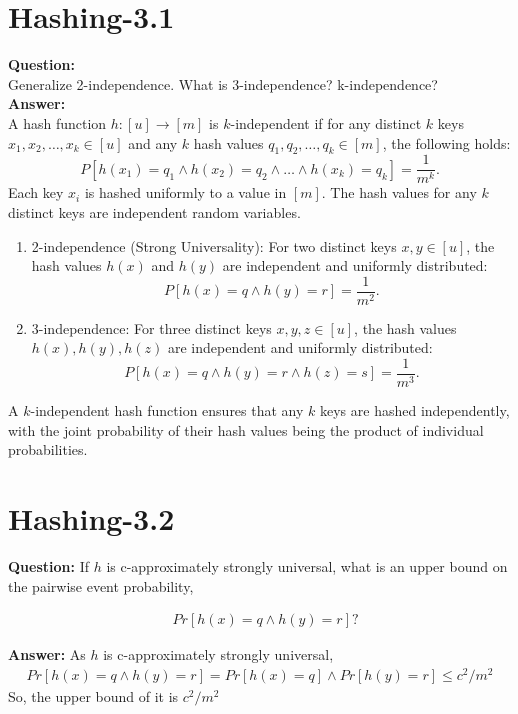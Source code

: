 \documentclass[12pt]{article}
\begin{document}
\section{Hashing-3.1}
\textbf{Question:}\\
Generalize 2-independence. What is 3-independence? k-independence?\\
\textbf{Answer:}\\
A hash function \( h : [u] \to [m] \) is \( k \)-independent if for any distinct \( k \) keys \( x_1, x_2, \dots, x_k \in [u] \) and any \( k \) hash values \( q_1, q_2, \dots, q_k \in [m] \), the following holds:
\[
P[h(x_1) = q_1 \land h(x_2) = q_2 \land \dots \land h(x_k) = q_k] = \frac{1}{m^k}.
\]
Each key \( x_i \) is hashed uniformly to a value in \( [m] \). The hash values for any \( k \) distinct keys are independent random variables.
\begin{enumerate}
    \item 2-independence (Strong Universality): For two distinct keys \( x, y \in [u] \), the hash values \( h(x) \) and \( h(y) \) are independent and uniformly distributed:
    \[
    P[h(x) = q \land h(y) = r] = \frac{1}{m^2}.
    \]
    \item 3-independence: For three distinct keys \( x, y, z \in [u] \), the hash values \( h(x), h(y), h(z) \) are independent and uniformly distributed:
    \[
    P[h(x) = q \land h(y) = r \land h(z) = s] = \frac{1}{m^3}.
    \]
\end{enumerate}
A \( k \)-independent hash function ensures that any \( k \) keys are hashed independently, with the joint probability of their hash values being the product of individual probabilities.

\section{Hashing-3.2}
\textbf{Question: }
If $h$ is c-approximately strongly universal, what is an upper bound on the pairwise event probability,

\begin{align}
&Pr[h(x) = q \wedge h(y) = r]?
\end{align}

\textbf{Answer:}
As $h$ is c-approximately strongly universal, 
\begin{align}
    Pr[h(x) = q \wedge h(y) = r] = Pr[h(x) = q] \wedge Pr[h(y) = r]\leq c^2/m^2
\end{align}
So, the upper bound of it is $c^2/m^2$
\end{document}

